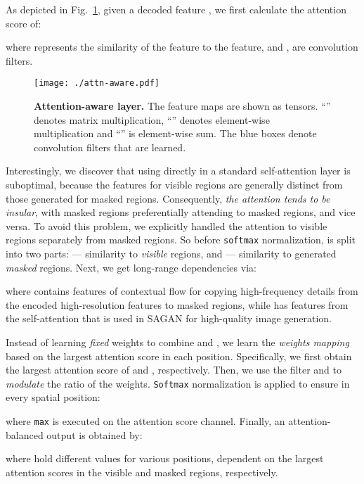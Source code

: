 \documentclass[10pt,twocolumn,letterpaper]{article}
\begin{document}
As depicted in Fig.~\ref{fig:attn-layer}, given a decoded feature , we first calculate the attention score of:

where  represents the similarity of the  feature to the  feature, and ,  are  convolution filters.

\begin{figure}[tb!]
    \centering
    \texttt{[image: ./attn-aware.pdf]}
    \vspace{-0.4cm}
    \caption{\textbf{Attention-aware layer.} The feature maps are shown as tensors. ``'' denotes matrix multiplication, ``'' denotes element-wise multiplication and ``'' is element-wise sum. The blue boxes denote  convolution filters that are learned.}
    \label{fig:attn-layer}
\end{figure}

Interestingly, we discover that using  directly in a standard self-attention layer is suboptimal, because the  features for visible regions are generally distinct from those generated for masked regions. Consequently, \emph{the attention tends to be insular}, with masked regions preferentially attending to masked regions, and vice versa. To avoid this problem, we explicitly handled the attention to visible regions separately from masked regions. So before \texttt{softmax} normalization,  is split into two parts:  --- similarity to \emph{visible} regions, and  --- similarity to generated \emph{masked} regions. Next, we get long-range dependencies via:

where  contains features of contextual flow \cite{yu2018generative} for copying high-frequency details from the encoded high-resolution features  to masked regions, while  has features from the self-attention that is used in SAGAN \cite{zhang2019self} for high-quality image generation. 

Instead of learning \emph{fixed} weights \cite{Zheng_2019_CVPR} to combine  and , we learn the \emph{weights mapping} based on the largest attention score in each position. Specifically, we first obtain the largest attention score of  and , respectively. Then, we use the  filter  and  to \emph{modulate} the ratio of the weights. \texttt{Softmax} normalization is applied to ensure  in every spatial position:

where \texttt{\small max} is executed on the attention score channel. Finally,  an attention-balanced output  is obtained by:

where  hold different values for various positions, dependent on the largest attention scores in the visible and masked regions, respectively. 
\end{document}
